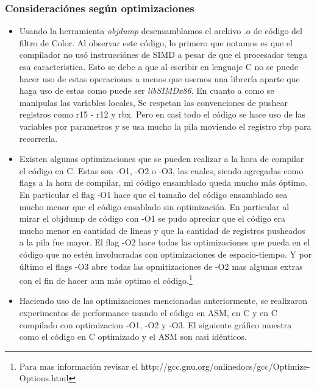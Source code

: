 \subsubsection{Consideraci\'ones seg\'un optimizaciones}
\begin{itemize}
 \item Usando la herramienta \emph{objdump} desensamblamos el archivo .o de c\'odigo del filtro de Color. Al observar este c\'odigo, lo primero que notamos es
 que el compilador no us\'o instrucci\'ones de SIMD a pesar de que el procesador tenga esa caracteristica. Esto se debe a que al escribir en lenguaje C
no se puede hacer uso de estas operaciones a menos que usemos una librer\'ia aparte que haga uso de estas como puede ser \emph{libSIMDx86}.\newline
En cuanto a como se manipulas las variables locales, Se respetan las convenciones de pushear registros como r15 - r12 y rbx. Pero en casi todo el c\'odigo
se hace uso de las variables por parametros y se usa mucho la pila moviendo el registro rbp para recorrerla.\newline
\item Existen algunas optimizaciones que se pueden realizar a la hora de compilar el c\'odigo en C. Estas son -O1, -O2 o -O3, las cuales, siendo agregadas
como flags a la hora de compilar, mi c\'odigo ensamblado queda mucho m\'as \'optimo. En particular el flag -O1 hace que el tamaño del c\'odigo ensamblado
sea mucho menor que el c\'odigo ensablado sin optimizaci\'on. En particular al mirar el objdump de c\'odigo con -O1 se pudo apreciar que el c\'odigo era
mucho menor en cantidad de lineas y que la cantidad de registros pusheados a la pila fue mayor.\newline
El flag -O2 hace todas las optimizaciones que pueda en el c\'odigo que no est\'en involucradas con optimizaciones de espacio-tiempo. Y por \'ultimo el flags
-O3 abre todas las opmitizaciones de -O2 mas algunas extras con el fin de hacer aun m\'as optimo el c\'odigo.\footnote{Para mas informaci\'on revisar el
http://gcc.gnu.org/onlinedocs/gcc/Optimize-Options.html}\newline
\item Haciendo uso de las optimizaciones mencionadas anteriormente, se realizaron experimentos de performance usando el c\'odigo en ASM, en C y en C 
compilado con optimizacion -O1, -O2 y -O3. El siguiente gr\'afico muestra como el c\'odigo en C optimizado y el ASM son casi id\'enticos.


\end{itemize}
